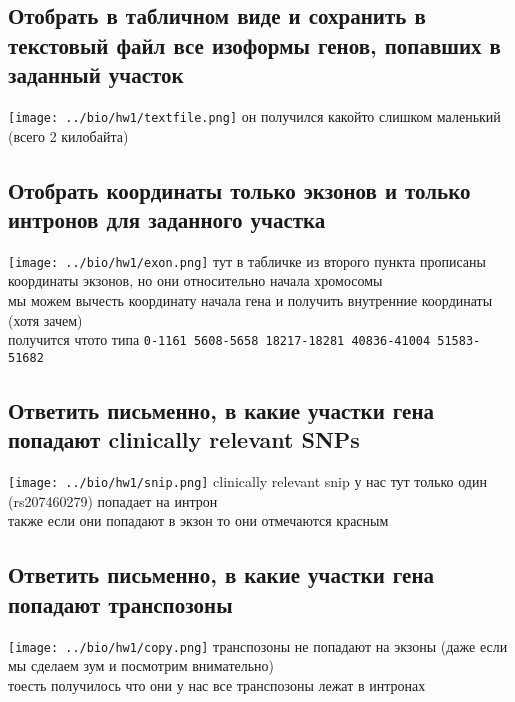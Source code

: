 \documentclass{article}
\begin{document}
  \subsection{Отобрать в табличном виде и сохранить в текстовый файл все изоформы генов, попавших в заданный участок}
  \texttt{[image: ../bio/hw1/textfile.png]}
  он получился какойто слишком маленький (всего 2 килобайта)

  \subsection{Отобрать координаты только экзонов и только интронов для заданного участка}
  \texttt{[image: ../bio/hw1/exon.png]}
  тут в табличке из второго пункта прописаны координаты экзонов, но они относительно начала хромосомы \\
  мы можем вычесть координату начала гена и получить внутренние координаты (хотя зачем) \\
  получится чтото типа \texttt{0-1161 5608-5658 18217-18281 40836-41004 51583-51682}


  \subsection{Ответить письменно, в какие участки гена попадают clinically relevant SNPs}
  \texttt{[image: ../bio/hw1/snip.png]}
  clinically relevant snip у нас тут только один (rs207460279) попадает на интрон \\
  также если они попадают в экзон то они отмечаются красным

  \subsection{Ответить письменно, в какие участки гена попадают транспозоны}
  \texttt{[image: ../bio/hw1/copy.png]}
  транспозоны не попадают на экзоны (даже если мы сделаем зум и посмотрим внимательно) \\
  тоесть получилось что они у нас все транспозоны лежат в интронах
\end{document}
